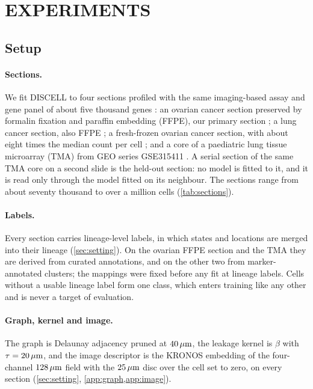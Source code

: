 \section{EXPERIMENTS}
\label{sec:experiments}

\subsection{Setup}
\label{sec:setup}

\paragraph{Sections.}
We fit DISCELL to four sections profiled with the same imaging-based assay and gene panel of about five thousand genes \citep{janesick2023}: an ovarian cancer section preserved by formalin fixation and paraffin embedding (FFPE), our primary section \citep{tenx_ovarian_ffpe}; a lung cancer section, also FFPE \citep{tenx_lung_ffpe}; a fresh-frozen ovarian cancer section, with about eight times the median count per cell \citep{tenx_ovary_ff}; and a core of a paediatric lung tissue microarray (TMA) from GEO series GSE315411 \citep{williamskatek2026fishing}. A serial section of the same TMA core on a second slide is the held-out section: no model is fitted to it, and it is read only through the model fitted on its neighbour. The sections range from about seventy thousand to over a million cells (\cref{tab:sections}).

\paragraph{Labels.}
 Every section carries lineage-level labels, in which states and locations are merged into their lineage (\cref{sec:setting}). On the ovarian FFPE section and the TMA they are derived from curated annotations, and on the other two from marker-annotated clusters; the mappings were fixed before any fit at lineage labels. Cells without a usable lineage label form one class, which enters training like any other and is never a target of evaluation.

\paragraph{Graph, kernel and image.}
 The graph is Delaunay adjacency pruned at $40\,\mu\text{m}$, the leakage kernel is $\beta$ with $\tau = 20\,\mu\text{m}$, and the image descriptor is the KRONOS embedding of the four-channel $128\,\mu\text{m}$ field with the $25\,\mu\text{m}$ disc over the cell set to zero, on every section (\cref{sec:setting}, \cref{app:graph,app:image}).

